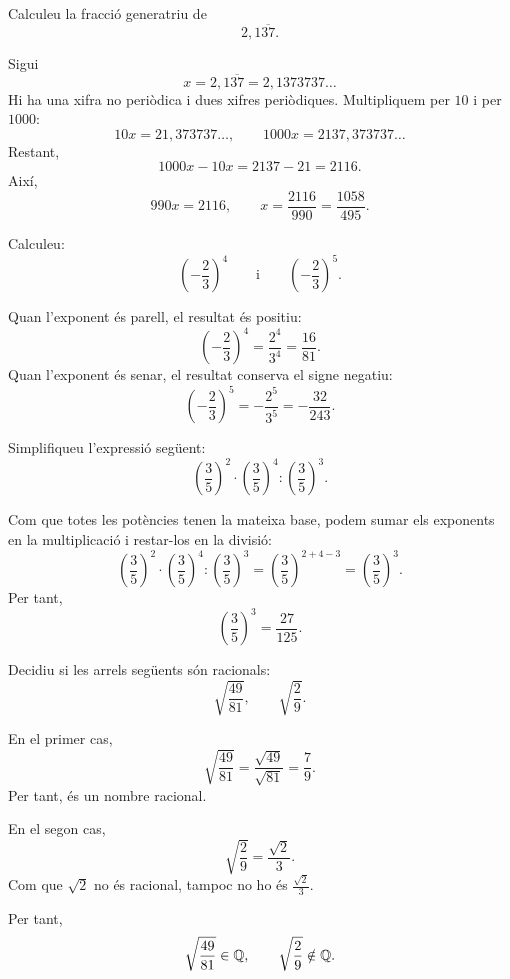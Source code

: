 \begin{exercici}
	Calculeu la fracció generatriu de
	\[
		2{,}1\overline{37}.
	\]
\end{exercici}

\begin{solucio}
	Sigui
	\[
		x=2{,}1\overline{37}=2{,}1373737\ldots
	\]
	Hi ha una xifra no periòdica i dues xifres periòdiques. Multipliquem per \(10\) i per \(1000\):
	\[
		10x=21{,}373737\ldots,
		\qquad
		1000x=2137{,}373737\ldots
	\]
	Restant,
	\[
		1000x-10x=2137-21=2116.
	\]
	Així,
	\[
		990x=2116,
		\qquad
		x=\frac{2116}{990}=\frac{1058}{495}.
	\]
\end{solucio}

\begin{exercici}
	Calculeu:
	\[
		\left(-\frac{2}{3}\right)^4
		\qquad\text{i}\qquad
		\left(-\frac{2}{3}\right)^5.
	\]
\end{exercici}

\begin{solucio}
	Quan l'exponent és parell, el resultat és positiu:
	\[
		\left(-\frac{2}{3}\right)^4
		=
		\frac{2^4}{3^4}
		=
		\frac{16}{81}.
	\]
	Quan l'exponent és senar, el resultat conserva el signe negatiu:
	\[
		\left(-\frac{2}{3}\right)^5
		=
		-\frac{2^5}{3^5}
		=
		-\frac{32}{243}.
	\]
\end{solucio}

\begin{exercici}
	Simplifiqueu l'expressió següent:
	\[
		\left(\frac{3}{5}\right)^2\cdot\left(\frac{3}{5}\right)^4:\left(\frac{3}{5}\right)^3.
	\]
\end{exercici}

\begin{solucio}
	Com que totes les potències tenen la mateixa base, podem sumar els exponents en la multiplicació i restar-los en la divisió:
	\[
		\left(\frac{3}{5}\right)^2\cdot\left(\frac{3}{5}\right)^4:
		\left(\frac{3}{5}\right)^3
		=
		\left(\frac{3}{5}\right)^{2+4-3}
		=
		\left(\frac{3}{5}\right)^3.
	\]
	Per tant,
	\[
		\left(\frac{3}{5}\right)^3
		=
		\frac{27}{125}.
	\]
\end{solucio}

\begin{exercici}
	Decidiu si les arrels següents són racionals:
	\[
		\sqrt{\frac{49}{81}},
		\qquad
		\sqrt{\frac{2}{9}}.
	\]
\end{exercici}

\begin{solucio}
	En el primer cas,
	\[
		\sqrt{\frac{49}{81}}
		=
		\frac{\sqrt{49}}{\sqrt{81}}
		=
		\frac{7}{9}.
	\]
	Per tant, és un nombre racional.

	En el segon cas,
	\[
		\sqrt{\frac{2}{9}}
		=
		\frac{\sqrt{2}}{3}.
	\]
	Com que \(\sqrt{2}\) no és racional, tampoc no ho és \(\frac{\sqrt{2}}{3}\).

	Per tant,
	\[
		\sqrt{\frac{49}{81}}\in\mathbb{Q},
		\qquad
		\sqrt{\frac{2}{9}}\notin\mathbb{Q}.
	\]
\end{solucio}

